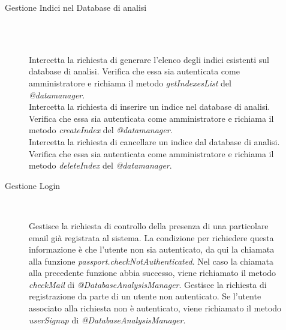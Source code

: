 \begin{description}
\begin{description}
\begin{mldescription}
 \end{mldescription}  
 \item[Gestione Indici nel Database di analisi] \hfill \\
  \begin{mldescription}
     \hfill \\
    Intercetta la richiesta di generare l'elenco degli indici esistenti sul database di analisi. Verifica che essa sia autenticata come amministratore e richiama il metodo \textit{getIndexesList} del \textit{@datamanager}.
     \hfill \\
    Intercetta la richiesta di inserire un indice nel database di analisi. Verifica che essa sia autenticata come amministratore e richiama il metodo \textit{createIndex} del \textit{@datamanager}.
     \hfill \\
     Intercetta la richiesta di cancellare un indice dal database di analisi. Verifica che essa sia autenticata come amministratore e richiama il metodo \textit{deleteIndex} del \textit{@datamanager}.
 \end{mldescription} 
 \item[Gestione Login] \hfill \\
 \begin{mldescription}
 Gestisce la richiesta di controllo della presenza di una particolare email già registrata al sistema. La condizione per richiedere questa informazione è che l'utente non sia autenticato, da qui la chiamata alla funzione \textit{passport.checkNotAuthenticated}. Nel caso la chiamata alla precedente funzione abbia successo, viene richiamato il metodo \textit{checkMail} di \textit{@DatabaseAnalysisManager}.
 Gestisce la richiesta di registrazione da parte di un utente non autenticato. Se l'utente associato alla richiesta non è autenticato, viene richiamato il metodo \textit{userSignup} di \textit{@DatabaseAnalysisManager}.

\end{mldescription}
\end{description}
\end{description}
